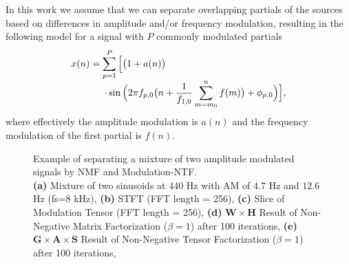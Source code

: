 In this work we assume that we can separate overlapping partials of the sources based on differences in amplitude and/or frequency modulation, resulting in the following model for a signal with $P$ commonly modulated partials
\begin{equation}
  \begin{array}{l}
   x(n) = \displaystyle \sum_{p=1}^{P} \Big[\big(1 + a(n)\big) \\
   \hspace{3.5em}\displaystyle \cdot\sin \Big(2\pi f_{p,0}\big(n + \frac{1}{f_{1,0}} \sum_{m=m_0}^{n}{f(m)} \big) + \phi_{p,0} \Big)\Big] ,
  \end{array}
\end{equation}
where effectively the amplitude modulation is $a(n)$ and the frequency modulation of the first partial is $f(n)$.

\begin{figure}[H]
    \centering
    \tiny
    \hfill
    \subfloat[Spectrogram]{
    }%
    \hfill

    \subfloat[NMF]{
    }\hfill
    \hfill
    \caption{Example of separating a mixture of two amplitude modulated signals by NMF and Modulation-NTF. \\ \textbf{(a)} Mixture of two sinusoids at $440$ Hz with AM of $4.7$ Hz and $12.6$ Hz (fs=$8$ kHz), \textbf{(b)} STFT (FFT length = 256), \textbf{(c)} Slice of Modulation Tensor (FFT length = 256),  \textbf{(d)} $\mathbf{W} \times \mathbf{H}$ Result of Non-Negative Matrix Factorization ($\beta = 1$) after 100 iterations, \textbf{(e)}  $\mathbf{G} \times \mathbf{A} \times \mathbf{S} $ Result of Non-Negative Tensor Factorization ($\beta = 1$) after 100 iterations,}
    \label{fig:tensor}
\end{figure}

